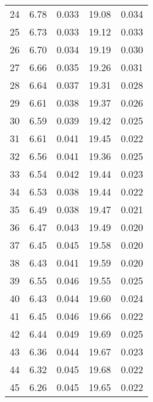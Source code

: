\begin{table}
\begin{tabular}{c|ll|ll}
24 & 6.78 & 0.033 & 19.08 & 0.034 \\
25 & 6.73 & 0.033 & 19.12 & 0.033 \\
26 & 6.70 & 0.034 & 19.19 & 0.030 \\
27 & 6.66 & 0.035 & 19.26 & 0.031 \\
28 & 6.64 & 0.037 & 19.31 & 0.028 \\
29 & 6.61 & 0.038 & 19.37 & 0.026 \\
30 & 6.59 & 0.039 & 19.42 & 0.025 \\
31 & 6.61 & 0.041 & 19.45 & 0.022 \\
32 & 6.56 & 0.041 & 19.36 & 0.025 \\
33 & 6.54 & 0.042 & 19.44 & 0.023 \\
34 & 6.53 & 0.038 & 19.44 & 0.022 \\
35 & 6.49 & 0.038 & 19.47 & 0.021 \\
36 & 6.47 & 0.043 & 19.49 & 0.020 \\
37 & 6.45 & 0.045 & 19.58 & 0.020 \\
38 & 6.43 & 0.041 & 19.59 & 0.020 \\
39 & 6.55 & 0.046 & 19.55 & 0.025 \\
40 & 6.43 & 0.044 & 19.60 & 0.024 \\
41 & 6.45 & 0.046 & 19.66 & 0.022 \\
42 & 6.44 & 0.049 & 19.69 & 0.025 \\
43 & 6.36 & 0.044 & 19.67 & 0.023 \\
44 & 6.32 & 0.045 & 19.68 & 0.022 \\
45 & 6.26 & 0.045 & 19.65 & 0.022 \\
               \hline
        \end{tabular}
    \end{table}
    \clearpage

